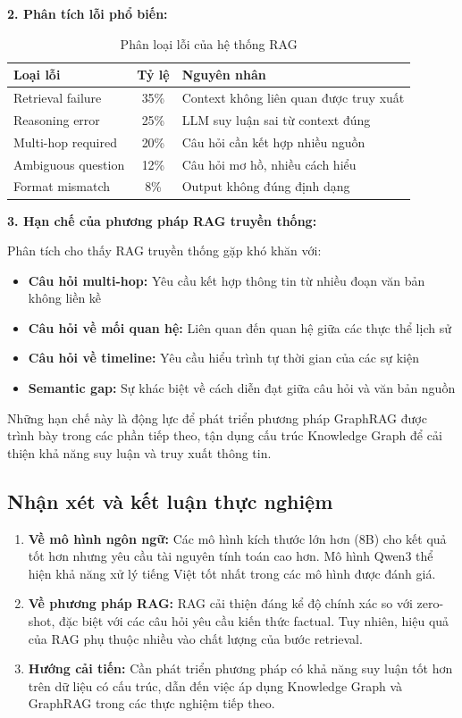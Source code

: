 \textbf{2. Phân tích lỗi phổ biến:}

\begin{table}[H]
\centering
\caption{Phân loại lỗi của hệ thống RAG}
\label{tab:error-analysis}
\begin{tabular}{|l|c|l|}
\hline
\textbf{Loại lỗi} & \textbf{Tỷ lệ} & \textbf{Nguyên nhân} \\
\hline
Retrieval failure & 35\% & Context không liên quan được truy xuất \\
Reasoning error & 25\% & LLM suy luận sai từ context đúng \\
Multi-hop required & 20\% & Câu hỏi cần kết hợp nhiều nguồn \\
Ambiguous question & 12\% & Câu hỏi mơ hồ, nhiều cách hiểu \\
Format mismatch & 8\% & Output không đúng định dạng \\
\hline
\end{tabular}
\end{table}

\textbf{3. Hạn chế của phương pháp RAG truyền thống:}

Phân tích cho thấy RAG truyền thống gặp khó khăn với:
\begin{itemize}
    \item \textbf{Câu hỏi multi-hop:} Yêu cầu kết hợp thông tin từ nhiều đoạn văn bản không liền kề
    \item \textbf{Câu hỏi về mối quan hệ:} Liên quan đến quan hệ giữa các thực thể lịch sử
    \item \textbf{Câu hỏi về timeline:} Yêu cầu hiểu trình tự thời gian của các sự kiện
    \item \textbf{Semantic gap:} Sự khác biệt về cách diễn đạt giữa câu hỏi và văn bản nguồn
\end{itemize}

Những hạn chế này là động lực để phát triển phương pháp GraphRAG được trình bày trong các phần tiếp theo, tận dụng cấu trúc Knowledge Graph để cải thiện khả năng suy luận và truy xuất thông tin.

\subsection{Nhận xét và kết luận thực nghiệm}

\begin{enumerate}
    \item \textbf{Về mô hình ngôn ngữ:} Các mô hình kích thước lớn hơn (8B) cho kết quả tốt hơn nhưng yêu cầu tài nguyên tính toán cao hơn. Mô hình Qwen3 thể hiện khả năng xử lý tiếng Việt tốt nhất trong các mô hình được đánh giá.
    
    \item \textbf{Về phương pháp RAG:} RAG cải thiện đáng kể độ chính xác so với zero-shot, đặc biệt với các câu hỏi yêu cầu kiến thức factual. Tuy nhiên, hiệu quả của RAG phụ thuộc nhiều vào chất lượng của bước retrieval.
    
    \item \textbf{Hướng cải tiến:} Cần phát triển phương pháp có khả năng suy luận tốt hơn trên dữ liệu có cấu trúc, dẫn đến việc áp dụng Knowledge Graph và GraphRAG trong các thực nghiệm tiếp theo.
\end{enumerate}
